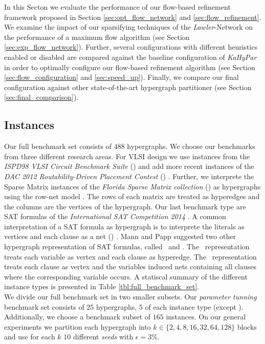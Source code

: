 In this Secton we evaluate the performance of our flow-based refinement framework proposed
in Section \ref{sec:opt_flow_network} and \ref{sec:flow_refinement}. We examine
the impact of our sparsifying techniques of the \emph{Lawler}-Network \cite{lawler1973} on the
performance of a maximum flow algorithm (see Section \ref{sec:exp_flow_network}). Further,
several configurations with different heuristics enabled or disabled are
compared against the baseline configuration of \emph{KaHyPar} in order to optimally
configure our flow-based refinement algorithm (see Section \ref{sec:flow_configuration} and
\ref{sec:speed_up}). Finally, we compare our final configuration against other
state-of-the-art hypergraph partitioner (see Section \ref{sec:final_comparison}).


\subsection{Instances}

Our full benchmark set consists of $488$ hypergraphs. We choose our benchmarks 
from three different research areas. For VLSI design we use instances from
the \emph{ISPD98 VLSI Circuit Benchmark Suite} (\ISPD) \cite{alpert1998ispd98} and add more recent
instances of the \emph{DAC 2012 Routability-Driven Placement Contest} (\DAC) \cite{viswanathan2012dac}.
Further, we interprete the Sparse Matrix instances of the \emph{Florida Sparse Matrix 
collection} (\SPM) \cite{davis2011university} as hypergraphs using the row-net model \cite{catalyurek1999hypergraph}.
The rows of each matrix are treated as hyperedges and the columns are the vertices of
the hypergraph. Our last benchmark type are SAT formulas of the \emph{International SAT
Competition 2014} \cite{belov2014application}. A common interpretation of a SAT formula 
as hypergraph is to interprete the literals as vertices and each clause as a net (\Literal) \cite{papa2007hypergraph}.
Mann and Papp \cite{mann2014formula} suggested two other hypergraph representation of
SAT formulas, called \Primal~and \Dual. The \Primal~representation treats each variable
as vertex and each clause as hyperedge. The \Dual~representation treats each clause as
vertex and the variables induced nets containing all clauses where the corresponding
variable occurs. A statiscal summary of the different instance types is presented in
Table \ref{tbl:full_benchmark_set}. \\
We divide our full benchmark set in two smaller subsets. Our \emph{parameter tunning}
benchmark set consists of $25$ hypergraphs, $5$ of each instance type (except \DAC). Additionally,
we choose a benchmark subset of $165$ instances. On our general experiments we partition
each hypergraph into $k \in \{2,4,8,16,32,64,128\}$ blocks and use for each $k$ $10$ different
\emph{seeds} with $\epsilon = 3\%$.

